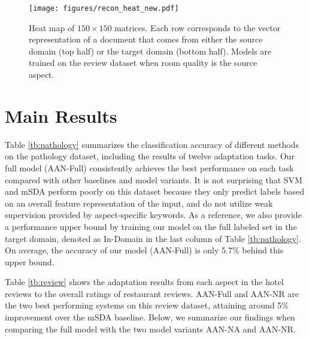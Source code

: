 \begin{figure*}[t]
\centering
\texttt{[image: figures/recon\_heat\_new.pdf]}
\caption{Heat map of $150\times 150$ matrices. Each row corresponds to the vector representation of a document that comes from either the source domain (top half) or the target domain (bottom half). Models are trained on the review dataset when room quality is the source aspect. 
}\label{fig:heat}
\end{figure*}



\section{Main Results}\label{sec:main}

Table \ref{tb:pathology} summarizes the classification accuracy of different methods on the pathology dataset, including the results of twelve adaptation tasks. Our full model (AAN-Full) consistently achieves the best performance on each task compared with other baselines and model variants. It is not surprising that SVM and mSDA perform poorly on this dataset because they only predict labels based on an overall feature representation of the input, and do not utilize weak supervision provided by aspect-specific keywords.  As a reference, we also provide a performance upper bound by training our model on the full labeled set in the target domain, denoted as In-Domain in the last column of Table \ref{tb:pathology}. On average, the accuracy of our model (AAN-Full) is only 5.7\% behind this upper bound.

Table \ref{tb:review} shows the adaptation results from each aspect in the hotel reviews to the overall ratings of restaurant reviews. AAN-Full and AAN-NR are the two best performing systems on this review dataset, attaining around 5\% improvement over the mSDA baseline. Below, we summarize our findings when comparing the full model with the two model variants AAN-NA and AAN-NR.

